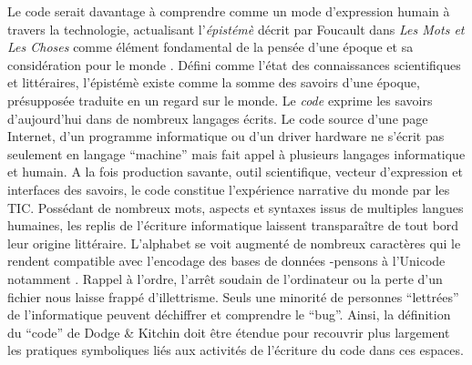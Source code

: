 Le code serait davantage à comprendre comme un mode d’expression humain à travers la technologie, actualisant l’\textit{épistémè} décrit par Foucault dans \textit{Les Mots et Les Choses} comme élément fondamental de la pensée d’une époque et sa considération pour le monde \citep{Foucault1996}. Défini comme l’état des connaissances scientifiques et littéraires, l'épistémè existe comme la somme des savoirs d’une époque, présupposée traduite en un regard sur le monde. Le \textit{code} exprime les savoirs d’aujourd’hui dans de nombreux langages écrits. Le code source d’une page Internet, d’un programme informatique ou d’un driver hardware ne s’écrit pas seulement en langage ``machine'' mais fait appel à plusieurs langages informatique et humain. A la fois production savante, outil scientifique, vecteur d’expression et interfaces des savoirs, le code constitue l’expérience narrative du monde par les TIC. Possédant de nombreux mots, aspects et syntaxes issus de multiples langues humaines, les replis de l’écriture informatique laissent transparaître de tout bord leur origine littéraire. L'alphabet se voit augmenté de nombreux caractères qui le rendent compatible avec l’encodage des bases de données -pensons à l’Unicode notamment \citep{Guichard2014}. Rappel à l'ordre, l'arrêt soudain de l’ordinateur ou la perte d’un fichier nous laisse frappé d’illettrisme. Seuls une minorité de personnes ``lettrées'' de l’informatique peuvent déchiffrer et comprendre le ``bug''. Ainsi, la définition du ``code'' de Dodge \&  Kitchin doit être étendue pour recouvrir plus largement les pratiques symboliques liés aux activités de l’écriture du code dans ces espaces.


